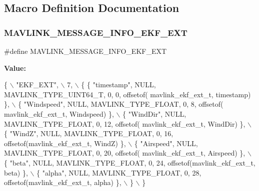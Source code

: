 \subsection{Macro Definition Documentation}
\mbox{\label{mavlink__msg__ekf__ext_8h_a4aec5412b876af35a2e3dd447a36b000}} 
\subsubsection{M\+A\+V\+L\+I\+N\+K\+\_\+\+M\+E\+S\+S\+A\+G\+E\+\_\+\+I\+N\+F\+O\+\_\+\+E\+K\+F\+\_\+\+E\+XT}
{\footnotesize\ttfamily \#define M\+A\+V\+L\+I\+N\+K\+\_\+\+M\+E\+S\+S\+A\+G\+E\+\_\+\+I\+N\+F\+O\+\_\+\+E\+K\+F\+\_\+\+E\+XT}

{\bfseries Value\+:}
\begin{DoxyCode}
\{ \(\backslash\)
    \textcolor{stringliteral}{"EKF\_EXT"}, \(\backslash\)
    7, \(\backslash\)
    \{  \{ \textcolor{stringliteral}{"timestamp"}, NULL, MAVLINK_TYPE_UINT64_T, 0, 0, offsetof(
      mavlink_ekf_ext_t, timestamp) \}, \(\backslash\)
         \{ \textcolor{stringliteral}{"Windspeed"}, NULL, MAVLINK_TYPE_FLOAT, 0, 8, offsetof(
      mavlink_ekf_ext_t, Windspeed) \}, \(\backslash\)
         \{ \textcolor{stringliteral}{"WindDir"}, NULL, MAVLINK_TYPE_FLOAT, 0, 12, offsetof(
      mavlink_ekf_ext_t, WindDir) \}, \(\backslash\)
         \{ \textcolor{stringliteral}{"WindZ"}, NULL, MAVLINK_TYPE_FLOAT, 0, 16, offsetof(mavlink_ekf_ext_t, WindZ) \}, \(\backslash\)
         \{ \textcolor{stringliteral}{"Airspeed"}, NULL, MAVLINK_TYPE_FLOAT, 0, 20, offsetof(
      mavlink_ekf_ext_t, Airspeed) \}, \(\backslash\)
         \{ \textcolor{stringliteral}{"beta"}, NULL, MAVLINK_TYPE_FLOAT, 0, 24, offsetof(mavlink_ekf_ext_t, beta) \}, \(\backslash\)
         \{ \textcolor{stringliteral}{"alpha"}, NULL, MAVLINK_TYPE_FLOAT, 0, 28, offsetof(mavlink_ekf_ext_t, alpha) \}, \(\backslash\)
         \} \(\backslash\)
\}
\end{DoxyCode}
\mbox{\label{mavlink__msg__ekf__ext_8h_aca4641294533ebedbbd0efc8eabc51ab}} 
